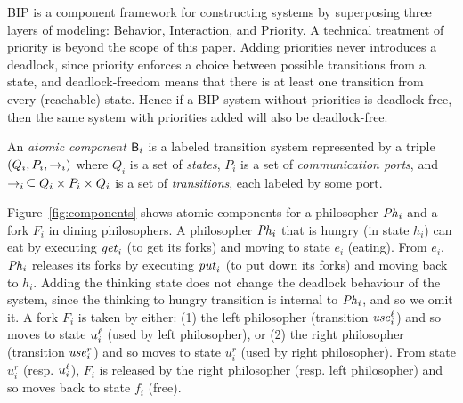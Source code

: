 
BIP is a component framework for constructing systems by superposing three layers of modeling: Behavior, Interaction,
and Priority.
%
A technical treatment of priority is beyond the scope of this paper. Adding priorities never introduces a deadlock,
since priority enforces a choice between possible transitions from a state, and deadlock-freedom means that there is at
least one transition from every (reachable) state.  Hence if a BIP system without priorities is deadlock-free, then the
same system with priorities added will also be deadlock-free.

\begin{definition}
An  {\em atomic component} $\mathsf{B}_i$ is a labeled transition system represented by a triple
$(Q_i, P_i, \stackrel{}{\rightarrow}_i)$ where $Q_i$ is a set of {\em states}, $P_i$ is a set of {\em communication ports}, and
$\stackrel{}{\rightarrow}_i\, \subseteq Q_i \times P_i \times Q_i$ is a set of \emph{transitions}, each labeled by some port.
\end{definition}


Figure~\ref{fig:components} shows atomic components for a philosopher $\mathit{Ph}_i$ and a fork $F_i$ in dining philosophers.
%
A philosopher $\mathit{Ph}_i$ that is hungry (in state $h_i$) can eat by executing $\mathit{get}_i$ (to get its forks) and moving to state $e_i$ (eating). From $e_i$,
$\mathit{Ph}_i$ releases its forks by executing $\mathit{put}_i$ (to put down its forks) and moving back to $h_i$.
%
Adding the thinking state does not change the deadlock behaviour of the system, since the thinking to hungry transition is internal to $\mathit{Ph}_i$, and so we
omit it.
%
A fork $F_i$ is taken by either: (1) the left philosopher (transition $\mathit{use}_i^\ell$) and so moves to state $u_i^\ell$ (used by left philosopher), or (2) the
right philosopher (transition $\mathit{use}_i^r$) and so moves to state $u_i^r$ (used by right philosopher). From state $u_i^r$ (resp. $u_i^\ell$), $F_i$ is released by
the right philosopher (resp. left philosopher) and so moves back to state $f_i$ (free).
%


